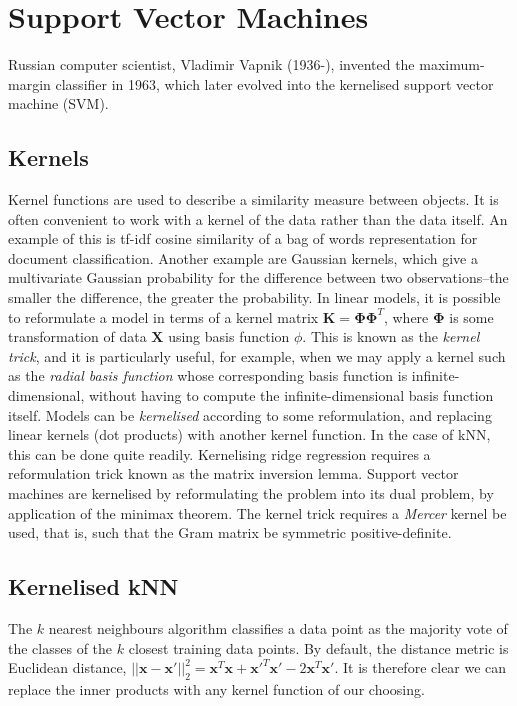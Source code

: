 \documentclass[11pt]{amsart}
\begin{document}
\section{Support Vector Machines}

Russian computer scientist, Vladimir Vapnik (1936-), invented the maximum-margin classifier in 1963, which later evolved into the kernelised support vector machine (SVM).

\subsection{Kernels}

Kernel functions are used to describe a similarity measure between objects. It is often convenient to work with a kernel of the data rather than the data itself. An example of this is tf-idf cosine similarity of a bag of words representation for document classification. Another example are Gaussian kernels, which give a multivariate Gaussian probability for the difference between two observations--the smaller the difference, the greater the probability. In linear models, it is possible to reformulate a model in terms of a kernel matrix $\mathbf{K} = \boldsymbol\Phi\boldsymbol\Phi^T$, where $\boldsymbol\Phi$ is some transformation of data $\mathbf{X}$ using basis function $\phi$. This is known as the \emph{kernel trick}, and it is particularly useful, for example, when we may apply a kernel such as the \emph{radial basis function} whose corresponding basis function is infinite-dimensional, without having to compute the infinite-dimensional basis function itself. Models can be \emph{kernelised} according to some reformulation, and replacing linear kernels (dot products) with another kernel function. In the case of kNN, this can be done quite readily. Kernelising ridge regression requires a reformulation trick known as the matrix inversion lemma. Support vector machines are kernelised by reformulating the problem into its dual problem, by application of the minimax theorem. The kernel trick requires a \emph{Mercer} kernel be used, that is, such that the Gram matrix be symmetric positive-definite.

\subsection{Kernelised kNN}

The $k$ nearest neighbours algorithm classifies a data point as the majority vote of the classes of the $k$ closest training data points. By default, the distance metric is Euclidean distance, $||\mathbf{x} - \mathbf{x}'||_2^2 = \mathbf{x}^T\mathbf{x} + \mathbf{x}'^T\mathbf{x}' - 2\mathbf{x}^T\mathbf{x}'$. It is therefore clear we can replace the inner products with any kernel function of our choosing.
\end{document}

